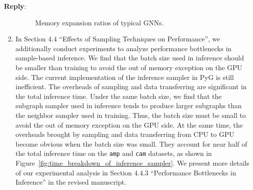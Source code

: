 \documentclass[12pt]{article}
\newenvironment{reply}
   {\medskip \noindent \textbf{Reply}:\  }
   {\medskip}
\begin{document}
\begin{reply}
\begin{enumerate}
    \begin{figure}[h]
        \caption{Memory expansion ratios of typical GNNs.}
        \label{fig:compare_memory_expasion_ratio}
    \end{figure}
    
    \item In Section 4.4 ``Effects of Sampling Techniques on Performance'', we additionally conduct experiments to analyze performance bottlenecks in sample-based inference.
    We find that the batch size used in inference should be smaller than training to avoid the out of memory exception on the GPU side.
    The current implementation of the inference sampler in PyG is still inefficient.
    The overheads of sampling and data transferring are significant in the total inference time.
    Under the same batch size, we find that the subgraph sampler used in inference tends to produce larger subgraphs than the neighbor sampler used in training.
    Thus, the batch size must be small to avoid the out of memory exception on the GPU side.
    At the same time, the overheads brought by sampling and data transferring from CPU to GPU become obvious when the batch size was small.
    They account for near half of the total inference time on the \texttt{amp} and \texttt{cam} datasets, as shown in Figure~\ref{fig:time_breakdown_of_inference_sampler}.
    We present more details of our experimental analysis in Section 4.4.3 ``Performance Bottlenecks in Inference'' in the revised manuscript.


\end{enumerate}
\end{reply}
\end{document}
